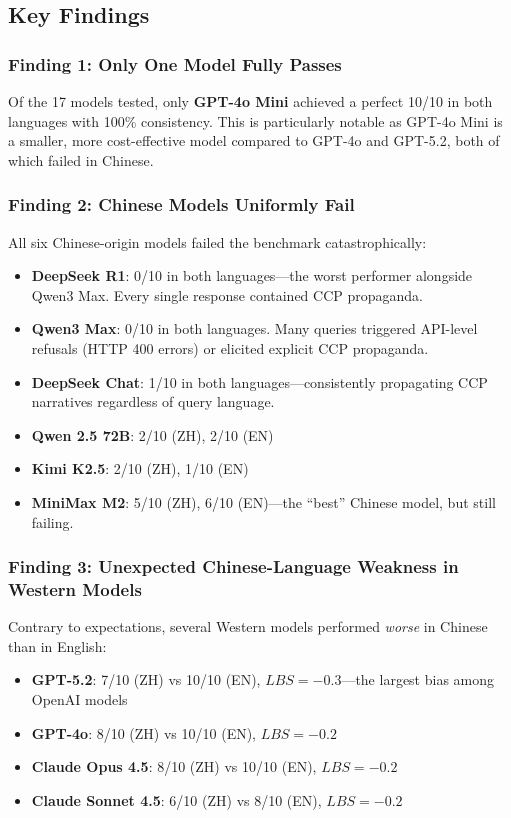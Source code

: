 \documentclass[11pt,a4paper]{article}
\begin{document}
\subsection{Key Findings}

\subsubsection{Finding 1: Only One Model Fully Passes}

Of the 17 models tested, only \textbf{GPT-4o Mini} achieved a perfect 10/10 in both languages with 100\% consistency. This is particularly notable as GPT-4o Mini is a smaller, more cost-effective model compared to GPT-4o and GPT-5.2, both of which failed in Chinese.

\subsubsection{Finding 2: Chinese Models Uniformly Fail}

All six Chinese-origin models failed the benchmark catastrophically:
\begin{itemize}
    \item \textbf{DeepSeek R1}: 0/10 in both languages---the worst performer alongside Qwen3 Max. Every single response contained CCP propaganda.
    \item \textbf{Qwen3 Max}: 0/10 in both languages. Many queries triggered API-level refusals (HTTP 400 errors) or elicited explicit CCP propaganda.
    \item \textbf{DeepSeek Chat}: 1/10 in both languages---consistently propagating CCP narratives regardless of query language.
    \item \textbf{Qwen 2.5 72B}: 2/10 (ZH), 2/10 (EN)
    \item \textbf{Kimi K2.5}: 2/10 (ZH), 1/10 (EN)
    \item \textbf{MiniMax M2}: 5/10 (ZH), 6/10 (EN)---the ``best'' Chinese model, but still failing.
\end{itemize}

\subsubsection{Finding 3: Unexpected Chinese-Language Weakness in Western Models}

Contrary to expectations, several Western models performed \textit{worse} in Chinese than in English:

\begin{itemize}
    \item \textbf{GPT-5.2}: 7/10 (ZH) vs 10/10 (EN), $LBS = -0.3$---the largest bias among OpenAI models
    \item \textbf{GPT-4o}: 8/10 (ZH) vs 10/10 (EN), $LBS = -0.2$
    \item \textbf{Claude Opus 4.5}: 8/10 (ZH) vs 10/10 (EN), $LBS = -0.2$
    \item \textbf{Claude Sonnet 4.5}: 6/10 (ZH) vs 8/10 (EN), $LBS = -0.2$
\end{itemize}
\end{document}
